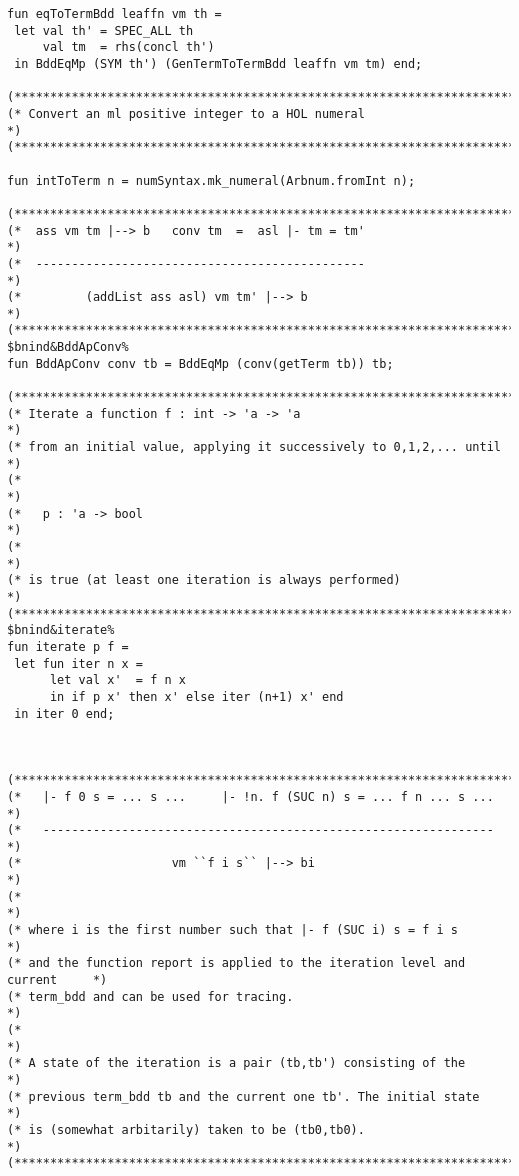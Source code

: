 \documentclass[12pt]{article}
\begin{document}
\begin{footnotesize}
\begin{Verbatim}[commandchars=\$\&\%]
fun eqToTermBdd leaffn vm th =
 let val th' = SPEC_ALL th
     val tm  = rhs(concl th')
 in BddEqMp (SYM th') (GenTermToTermBdd leaffn vm tm) end;

(*****************************************************************************)
(* Convert an ml positive integer to a HOL numeral                           *)
(*****************************************************************************)

fun intToTerm n = numSyntax.mk_numeral(Arbnum.fromInt n);

(*****************************************************************************)
(*  ass vm tm |--> b   conv tm  =  asl |- tm = tm'                           *)
(*  ----------------------------------------------                           *)
(*         (addList ass asl) vm tm' |--> b                                   *)
(*****************************************************************************)
$bnind&BddApConv%
fun BddApConv conv tb = BddEqMp (conv(getTerm tb)) tb;

(*****************************************************************************)
(* Iterate a function f : int -> 'a -> 'a                                    *)
(* from an initial value, applying it successively to 0,1,2,... until        *)
(*                                                                           *)
(*   p : 'a -> bool                                                          *)
(*                                                                           *)
(* is true (at least one iteration is always performed)                      *)
(*****************************************************************************)
$bnind&iterate%
fun iterate p f =
 let fun iter n x =
      let val x'  = f n x
      in if p x' then x' else iter (n+1) x' end
 in iter 0 end;



(*****************************************************************************)
(*   |- f 0 s = ... s ...     |- !n. f (SUC n) s = ... f n ... s ...         *)
(*   ---------------------------------------------------------------         *)
(*                     vm ``f i s`` |--> bi                                  *)
(*                                                                           *)
(* where i is the first number such that |- f (SUC i) s = f i s              *)
(* and the function report is applied to the iteration level and current     *)
(* term_bdd and can be used for tracing.                                     *)
(*                                                                           *)
(* A state of the iteration is a pair (tb,tb') consisting of the             *)
(* previous term_bdd tb and the current one tb'. The initial state           *)
(* is (somewhat arbitarily) taken to be (tb0,tb0).                           *)
(*****************************************************************************)


\end{Verbatim}
\end{footnotesize}
\end{document}
